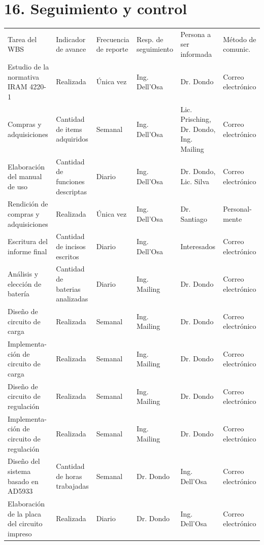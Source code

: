 \documentclass[11pt]{charter}
\begin{document}
\pagebreak

\section{16. Seguimiento y control}
\label{sec:seguimiento}

\begin{table}[H]
\centering
\begin{tabularx}{\linewidth}{@{}|X|X|X|X|X|X|@{}}
\hline
\rowcolor[HTML]{C0C0C0} 
\multicolumn{6}{|c|}{\cellcolor[HTML]{C0C0C0}SEGUIMIENTO DE AVANCE}                                                                       \\ \hline
\rowcolor[HTML]{C0C0C0} 
Tarea del WBS & Indicador de avance & Frecuencia de reporte & Resp. de seguimiento & Persona a ser informada & Método de comunic. \\ \hline
Estudio de la normativa IRAM 4220-1 & Realizada & Única vez & Ing. Dell'Osa & Dr. Dondo & Correo electrónico \\ \hline
Compras y adquisiciones & Cantidad de items adquiridos & Semanal & Ing. Dell'Osa & Lic. Prisching, Dr. Dondo, Ing. Mailing & Correo electrónico \\ \hline
Elaboración del manual de uso & Cantidad de funciones descriptas & Diario & Ing. Dell'Osa & Dr. Dondo, Lic. Silva & Correo electrónico \\ \hline
Rendición de compras y adquisiciones  & Realizada & Única vez & Ing. Dell'Osa & Dr. Santiago & Personal- mente \\ \hline
Escritura del informe final & Cantidad de incisos escritos & Diario & Ing. Dell'Osa & Interesados & Correo electrónico \\ \hline
Análisis y elección de batería & Cantidad de baterias analizadas & Diario & Ing. Mailing & Dr. Dondo & Correo electrónico \\ \hline
Diseño de circuito de carga & Realizada & Semanal & Ing. Mailing & Dr. Dondo & Correo electrónico \\ \hline
Implementa- ción de circuito de carga  &  Realizada & Semanal & Ing. Mailing & Dr. Dondo & Correo electrónico \\ \hline
Diseño de circuito de regulación & Realizada & Semanal & Ing. Mailing & Dr. Dondo & Correo electrónico \\ \hline
Implementa- ción de circuito de regulación  & Realizada & Semanal & Ing. Mailing & Dr. Dondo & Correo electrónico \\ \hline
Diseño del sistema basado en AD5933 & Cantidad de horas trabajadas  & Semanal & Dr. Dondo & Ing. Dell'Osa & Correo electrónico \\ \hline
Elaboración de la placa del circuito impreso  & Realizada & Diario & Dr. Dondo & Ing. Dell'Osa & Correo electrónico \\ \hline
\end{tabularx}%
\end{table}
\end{document}
